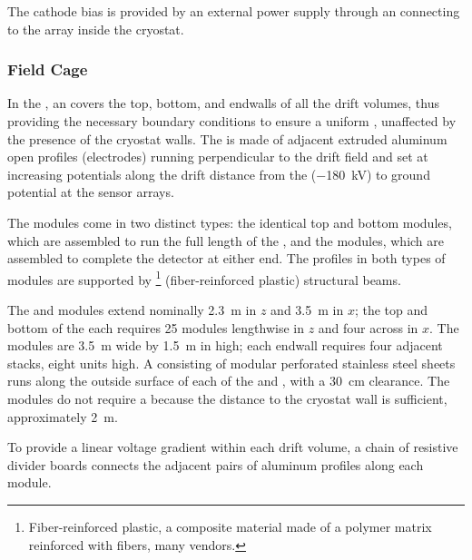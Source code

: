 The cathode bias is provided by an external  power supply through an  \fdth connecting to the  array %
inside the cryostat. 
 
\subsubsection{Field Cage}
\label{sec:fdsp-hv-des-fc}

In the , an  covers the top, bottom, and endwalls of all the drift volumes, thus providing the necessary
boundary conditions to ensure a uniform \efield, unaffected by the presence of the cryostat walls. %
The  is made of adjacent extruded aluminum open profiles (electrodes) running perpendicular to the drift field and set at increasing potentials along the \spmaxdrift drift distance from the   (\SI{-180}{kV}) to ground potential at the  sensor arrays. %

The  modules come in two distinct types: the identical top and bottom modules, which are assembled to run the full length of the , and the  modules, 
which are assembled to complete the detector at either end. %
The profiles in both types of modules are supported by \footnote{Fiber-reinforced plastic, a composite material made of a polymer matrix reinforced with fibers, many vendors.} (fiber-reinforced plastic) structural beams.  

The  and  modules extend nominally  \SI{2.3}{\meter} in $z$ and \SI{3.5}{\meter} in $x$; the top and bottom of the  each requires 25 modules lengthwise in $z$ and four across in $x$.  The  modules are \SI{3.5}{\meter} wide by \SI{1.5}{\meter} in high; each endwall requires four adjacent stacks, eight units high. A  consisting of modular %
perforated stainless steel sheets %
runs along the outside surface of each of the %
 and , with a \SI{30}{\centi\meter} clearance. The  modules do not require a  because the distance to the cryostat wall is sufficient, approximately \SI{2}{\meter}.

To provide a linear voltage gradient within each drift volume, %
a chain of resistive divider boards connects the adjacent pairs of aluminum profiles along each  module. 


